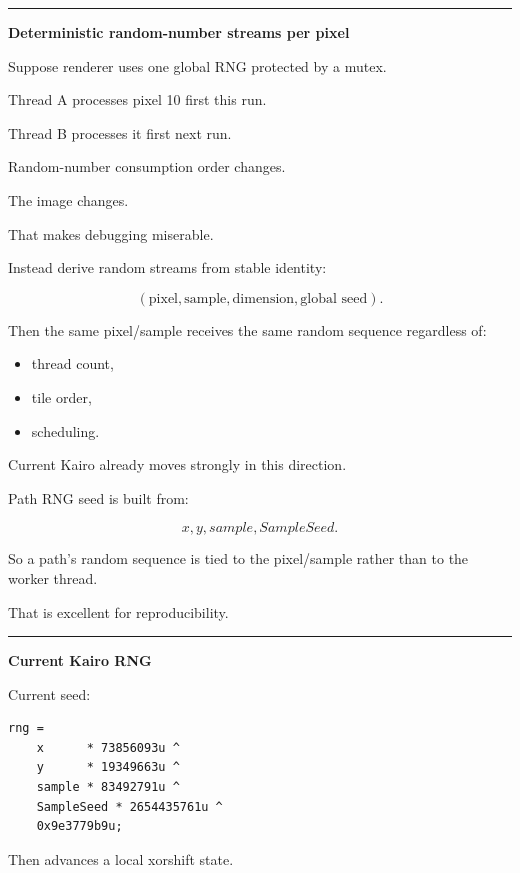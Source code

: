 \begin{center}\rule{0.5\linewidth}{0.5pt}\end{center}

\textbf{Deterministic random-number streams per pixel}

Suppose renderer uses one global RNG protected by a mutex.

Thread A processes pixel 10 first this run.

Thread B processes it first next run.

Random-number consumption order changes.

The image changes.

That makes debugging miserable.

Instead derive random streams from stable identity:

\[
\boxed{
(\text{pixel},\text{sample},\text{dimension},\text{global seed}).
}
\]

Then the same pixel/sample receives the same random sequence regardless of:

\begin{itemize}
\tightlist
\item
  thread count,
\item
  tile order,
\item
  scheduling.
\end{itemize}

Current Kairo already moves strongly in this direction.

Path RNG seed is built from:

\[
x,
y,
sample,
SampleSeed.
\]

So a path's random sequence is tied to the pixel/sample rather than to the worker thread.

That is excellent for reproducibility.

\begin{center}\rule{0.5\linewidth}{0.5pt}\end{center}

\textbf{Current Kairo RNG}

Current seed:

\begin{verbatim}
rng =
    x      * 73856093u ^
    y      * 19349663u ^
    sample * 83492791u ^
    SampleSeed * 2654435761u ^
    0x9e3779b9u;
\end{verbatim}

Then  advances a local xorshift state.

